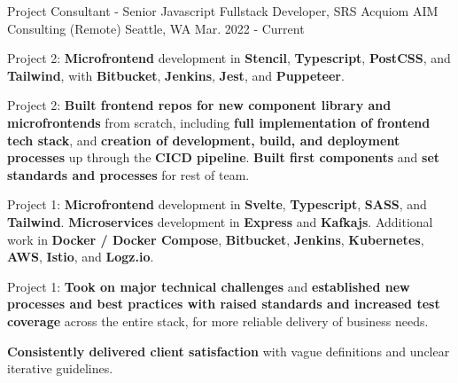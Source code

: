 \begin{cventries}
\cventry
{Project Consultant - Senior Javascript Fullstack Developer, SRS Acquiom} %
{AIM Consulting (Remote)} %
{Seattle, WA} %
{Mar. 2022 - Current} %
{
\begin{cvitems}
\item {Project 2: \textbf{Microfrontend} development in \textbf{Stencil}, \textbf{Typescript}, \textbf{PostCSS}, and \textbf{Tailwind}, with \textbf{Bitbucket}, \textbf{Jenkins}, \textbf{Jest}, and \textbf{Puppeteer}.}
\item {Project 2: \textbf{Built frontend repos for new component library and microfrontends} from scratch, including \textbf{full implementation of frontend tech stack}, and \textbf{creation of development, build, and deployment processes} up through the \textbf{CICD pipeline}. \textbf{Built first components} and \textbf{set standards and processes} for rest of team.}
\item {Project 1: \textbf{Microfrontend} development in \textbf{Svelte}, \textbf{Typescript}, \textbf{SASS}, and \textbf{Tailwind}. \textbf{Microservices} development in \textbf{Express} and \textbf{Kafkajs}. Additional work in \textbf{Docker / Docker Compose}, \textbf{Bitbucket}, \textbf{Jenkins}, \textbf{Kubernetes}, \textbf{AWS}, \textbf{Istio}, and \textbf{Logz.io}.}
\item {Project 1: \textbf{Took on major technical challenges} and \textbf{established new processes and best practices with raised standards and increased test coverage} across the entire stack, for more reliable delivery of business needs.}
\item {\textbf{Consistently delivered client satisfaction} with vague definitions and unclear iterative guidelines.}
\end{cvitems}
}


\end{cventries}
